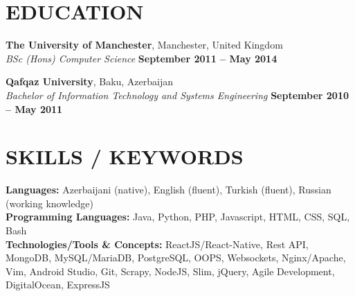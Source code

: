 \documentclass[margin,line]{resume}
\begin{document}
\begin{resume}
    \section{\mysidestyle \textbf{\large{E}\small{DUCATION}}}

    \textbf{\listing The University of Manchester}, Manchester, United Kingdom \vspace{1mm}\\
    \textsl{BSc (Hons) Computer Science} \hfill \textbf{September 2011 -- May 2014}\vspace{-3mm}\\\vspace{-1mm}%

    \textbf{\listing Qafqaz University}, Baku, Azerbaijan \vspace{1mm}\\
    \textsl{Bachelor of Information Technology and Systems Engineering} \hfill \textbf{September 2010 -- May 2011}\vspace{-3mm}\\\vspace{-1mm}%

    \vspace{-1mm}

\sectionline

    \section{\mysidestyle \textbf{\large{S}\small{KILLS} / \large{K}\small{EYWORDS}}}

    \textbf{Languages:} Azerbaijani (native), English (fluent), Turkish (fluent), Russian (working knowledge)\vspace{1mm}\\
    \textbf{Programming Languages:} Java, Python, PHP, Javascript, HTML, CSS, SQL, Bash\vspace{1mm}\\
    \textbf{Technologies/Tools \& Concepts:} ReactJS/React-Native, Rest API, MongoDB, MySQL/MariaDB, PostgreSQL, OOPS, Websockets, Nginx/Apache, Vim, Android Studio, Git, Scrapy, NodeJS, Slim, jQuery, Agile Development, DigitalOcean, ExpressJS\vspace{1mm}\\
 



\end{resume}
\end{document}

